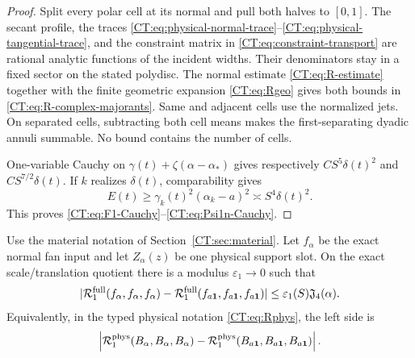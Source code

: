 \begin{proof}
Split every polar cell at its normal and pull both halves to $[0,1]$.
The secant profile, the traces
\eqref{CT:eq:physical-normal-trace}--\eqref{CT:eq:physical-tangential-trace},
and the constraint matrix in \eqref{CT:eq:constraint-transport} are rational
analytic functions of the incident widths.  Their denominators stay in a
fixed sector on the stated polydisc.  The normal estimate
\eqref{CT:eq:R-estimate} together with the finite geometric expansion
\eqref{CT:eq:Rgeo} gives both bounds in
\eqref{CT:eq:R-complex-majorants}.  Same and adjacent cells use
the normalized jets.  On separated cells, subtracting both cell means
makes the first-separating dyadic annuli summable.  No bound contains the
number of cells.

One-variable Cauchy on
$\gamma(t)+\zeta(\alpha-\alpha_*)$ gives respectively
$CS^5\delta(t)^2$ and $CS^{7/2}\delta(t)$.  If $k$ realizes $\delta(t)$, comparability gives
\begin{equation*}
 E(t)\ge\gamma_k(t)^2(\alpha_k-a)^2
       \asymp S^4\delta(t)^2.
\end{equation*}
This proves \eqref{CT:eq:F1-Cauchy}--\eqref{CT:eq:Psi1n-Cauchy}.
\end{proof}

\begin{lemma}
\label{CT:lem:R-relative}
Use the material notation of Section~\ref{CT:sec:material}.  Let $f_\alpha$
be the exact normal fan input and let
$Z_\alpha(z)$ be one physical support slot.  On the exact scale/translation
quotient there is a modulus $\varepsilon_{1}\to0$ such that
\begin{equation}
 |\mathcal R_1^{\rm full}(f_\alpha,f_\alpha,f_\alpha)
  -\mathcal R_1^{\rm full}(f_{a\mathbf1},f_{a\mathbf1},f_{a\mathbf1})|
 \le\varepsilon_1(S)\mathfrak J_4(\alpha).\label{CT:eq:R-relative-pure}
\end{equation}
Equivalently, in the typed physical notation \eqref{CT:eq:Rphys}, the left
side is
\begin{equation}
 \left|\mathcal R_1^{\rm phys}(B_\alpha,B_\alpha,B_\alpha)
       -\mathcal R_1^{\rm phys}(B_{a\mathbf1},B_{a\mathbf1},B_{a\mathbf1})\right|.
\end{equation}
\end{lemma}

